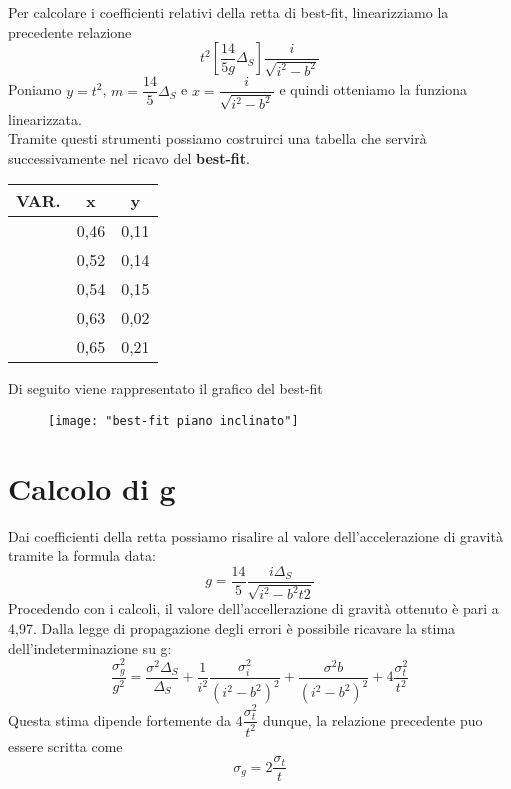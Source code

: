 \documentclass[a4paper, 12pt]{article} %
\begin{document}
Per calcolare i coefficienti relativi della retta di best-fit, linearizziamo la precedente relazione
$$t^{2}[\dfrac{14}{5g}\Delta_{S}]\dfrac{i}{\sqrt{i^{2}-b^{2}}}$$
Poniamo $y=t^{2}$, $m=\dfrac{14}{5}\Delta_{S}$ e $x=\dfrac{i}{\sqrt{i^{2}-b^{2}}}$ e quindi otteniamo la funziona linearizzata.\\
Tramite questi strumenti possiamo costruirci una tabella che servirà successivamente nel ricavo del \textbf{best-fit}.
\begin{table} [h]
	\begin{center}
		\begin{tabular}{|c|c|c|}
			
			\hline
			VAR.  & x & y\\
			\hline
			 & 0,46 & 0,11\\
			\hline
			& 0,52  & 0,14\\
			\hline
			& 0,54 & 0,15\\
			\hline
			& 0,63 & 0,02\\
			\hline
			& 0,65 & 0,21\\
			\hline
			
		\end{tabular}
	\end{center}
\end{table}

Di seguito viene rappresentato il grafico del best-fit
\begin{figure} [h]
	\centering
	\texttt{[image: "best-fit piano inclinato"]}

\end{figure}


\section{Calcolo di g}
Dai coefficienti della retta possiamo risalire al valore dell'accelerazione di gravità tramite la formula data:
$$g=\dfrac{14}{5}\dfrac{i\Delta_{S}}{\sqrt{i^{2}-b^{2}t2}}$$
Procedendo con i calcoli, il valore dell'accellerazione di gravità ottenuto è pari a 4,97.
Dalla legge di propagazione degli errori è possibile ricavare la stima dell'indeterminazione su g:
$$\dfrac{\sigma^{2}_{g}}{g^{2}}=\dfrac{\sigma^{2}\Delta_{S}}{\Delta_{S}}+\dfrac{1}{i^{2}}\dfrac{\sigma^{2}_{i}}{(i^{2}-b^{2})^{2}}+\dfrac{\sigma^{2}b}{(i^{2}-b^{2})^{2}}+4\dfrac{\sigma^{2}_{t}}{t^{2}}$$
Questa stima dipende fortemente da $4\dfrac{\sigma^{2}_{t}}{t^{2}}$ dunque, la relazione precedente puo essere scritta come
$$\sigma_{g}=2\dfrac{\sigma_{t}}{t}$$
\end{document}
